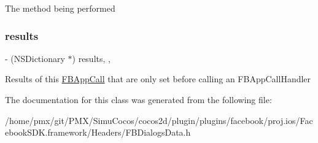 The method being performed \mbox{\label{interfaceFBDialogsData_acf7d8cf16ffae9acaed5aa1ad1161765}} 
\subsubsection{\texorpdfstring{results}{results}}
{\footnotesize\ttfamily -\/ (N\+S\+Dictionary $\ast$) results\hspace{0.3cm}{\ttfamily [read]}, {\ttfamily [nonatomic]}, {\ttfamily [assign]}}

Results of this \hyperlink{interfaceFBAppCall}{F\+B\+App\+Call} that are only set before calling an F\+B\+App\+Call\+Handler 

The documentation for this class was generated from the following file\+:\begin{DoxyCompactItemize}
\item 
/home/pmx/git/\+P\+M\+X/\+Simu\+Cocos/cocos2d/plugin/plugins/facebook/proj.\+ios/\+Facebook\+S\+D\+K.\+framework/\+Headers/F\+B\+Dialogs\+Data.\+h\end{DoxyCompactItemize}
